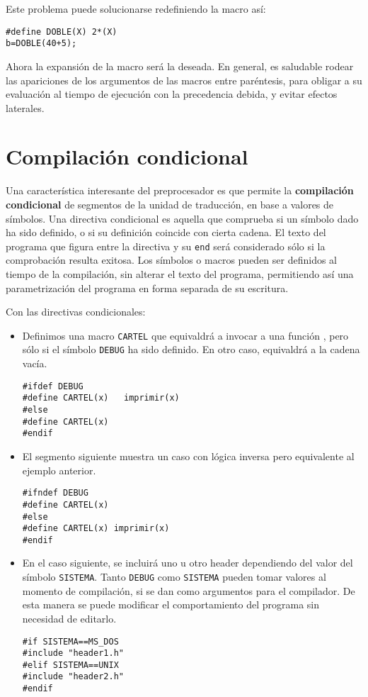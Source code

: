 Este problema puede solucionarse redefiniendo la macro así:
\begin{lstlisting}
#define DOBLE(X) 2*(X)
b=DOBLE(40+5);
\end{lstlisting}
Ahora la expansión de la macro será la deseada. En general, es saludable rodear las apariciones de los
argumentos de las macros entre paréntesis, para obligar a su evaluación al tiempo de ejecución con la
precedencia debida, y evitar efectos laterales.


\section{Compilación condicional}

Una característica interesante del preprocesador es que permite la \textbf{compilación condicional} de segmentos de la unidad de traducción, en base a valores de símbolos. Una directiva condicional es aquella que comprueba si un símbolo dado ha sido definido, o si su definición coincide con cierta cadena. El texto del programa que figura entre la directiva y su \lstinline{end} será considerado sólo si la comprobación resulta exitosa. Los símbolos o macros pueden ser definidos al tiempo de la compilación, sin alterar el texto del programa, permitiendo así una parametrización del programa en forma separada de su escritura.

\begin{ejemplo}
Con las directivas condicionales:
\begin{itemize}
	\item Definimos una macro \lstinline{CARTEL} que equivaldrá a invocar a una función ,
pero sólo si el símbolo \lstinline{DEBUG} ha sido definido. En otro caso, equivaldrá a la cadena vacía. 
\begin{lstlisting}
#ifdef DEBUG
#define CARTEL(x)	imprimir(x)
#else
#define CARTEL(x)
#endif
\end{lstlisting}
\item El segmento siguiente muestra un caso con lógica inversa pero equivalente al ejemplo anterior.
\begin{lstlisting}
#ifndef DEBUG
#define CARTEL(x)
#else
#define CARTEL(x) imprimir(x)
#endif
\end{lstlisting}
\item En el caso siguiente, se incluirá uno u otro header dependiendo del valor del símbolo \lstinline{SISTEMA}. Tanto
\lstinline{DEBUG} como \lstinline{SISTEMA} pueden tomar valores al momento de compilación, si se dan como
argumentos para el compilador. De esta manera se puede modificar el comportamiento del programa
sin necesidad de editarlo.

\begin{lstlisting}
#if SISTEMA==MS_DOS
#include "header1.h"
#elif SISTEMA==UNIX
#include "header2.h"
#endif
\end{lstlisting}
\end{itemize}
\end{ejemplo}

